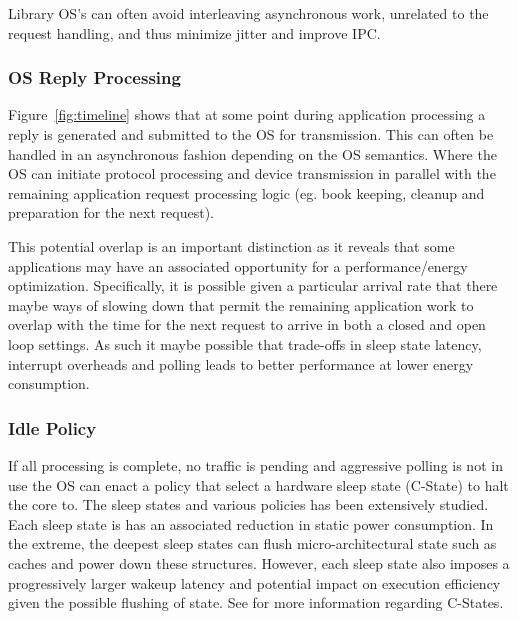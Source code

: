 Library OS's can often avoid interleaving asynchronous work, unrelated to the request handling,  and thus minimize jitter and improve IPC. %

\subsubsection{OS Reply Processing}
\label{sec:workflow:osrepproc}

Figure~\ref{fig:timeline} shows that at some point during application processing a reply is generated and submitted to the OS for transmission.  This can often be handled in an asynchronous fashion depending on the OS semantics.  Where the OS can initiate protocol processing and device transmission in parallel with the remaining application request processing logic (eg. book keeping, cleanup and preparation for the next request).

This potential overlap is an important distinction as it reveals that some applications may have an associated opportunity for a performance/energy optimization.  Specifically, it is possible given a particular arrival rate that there maybe ways of slowing down that permit the remaining application work to overlap with the time for the next request to arrive in both a closed and open loop settings.  As such it maybe possible that trade-offs in sleep state latency, interrupt overheads and polling leads to better performance at lower energy consumption.  

\subsubsection{Idle Policy}
\label{sec:workflow:idlepolicy}

If all processing is complete, no traffic is pending and aggressive polling is not in use the OS can enact a policy that select a hardware sleep state (C-State) to halt the core to.  The sleep states and various policies has been extensively studied\cite{}.  Each sleep state is has an associated reduction in static power consumption. In the extreme, the deepest sleep states can flush micro-architectural state such as caches and power down these structures. However, each sleep state also imposes a progressively larger wakeup latency and potential impact on execution efficiency given the possible flushing of state. See \cite{brooks,udpm} for more information regarding C-States. 


